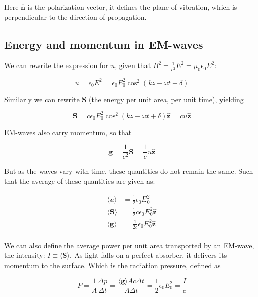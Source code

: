 \documentclass[a4paper]{article}
\begin{document}
Here $\hat{\bm{n}}$ is the polarization vector, it defines the plane of vibration, which is perpendicular to the direction of propagation.

\subsection{Energy and momentum in EM-waves}

We can rewrite the expression for $u$, given that $B^2=\frac{1}{c^2}E^2=\mu_0\epsilon_0E^2$:

\begin{equation*}
    u=\epsilon_0E^2=\epsilon_0E_0^2\cos^2(kz-\omega t+\delta)
\end{equation*}

Similarly we can rewrite $\bm{S}$ (the energy per unit area, per unit time), yielding

\begin{equation*}
    \bm{S}=c\epsilon_0E_0^2\cos^2(kz-\omega t+\delta)\hat{\bm{z}}=cu\hat{\bm{z}}
\end{equation*}

EM-waves also carry momentum, so that

\begin{equation*}
    \bm{g}=\frac{1}{c^2}\bm{S}=\frac{1}{c}u\hat{\bm{z}}
\end{equation*}

But as the waves vary with time, these quantities do not remain the same. Such that the average of these quantities are given as:

\begin{align*}
    \langle u\rangle &= \frac{1}{2}\epsilon_0E_0^2\\[1em]
    \langle \bm{S}\rangle &= \frac{1}{2}c\epsilon_0E_0^2\hat{\bm{z}}\\[1em]
    \langle \bm{g}\rangle &= \frac{1}{2c}\epsilon_0E_0^2\hat{\bm{z}}\\
\end{align*}

We can also define the average power per unit area transported by an EM-wave, the intensity: $I\equiv\langle\bm{S}\rangle$. As light falls on a perfect absorber, it delivers its momentum to the surface. Which is the radiation pressure, defined as

\begin{equation*}
    P=\frac{1}{A}\frac{\Delta p}{\Delta t}=\frac{\langle\bm{g}\rangle Ac\Delta t}{A\Delta t}=\frac{1}{2}\epsilon_0E_0^2=\frac{I}{c}
\end{equation*}
\end{document}
